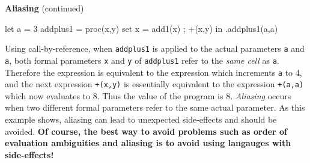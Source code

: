\begin{minipage}[t]{\sw}
\slidenumber
\LARGE
{\bf Aliasing} (continued)
\begin{qv}
let
  a = 3
  addplus1 = proc(x,y) {set x = add1(x) ; +(x,y)}
in
  .addplus1(a,a)
\end{qv}
Using call-by-reference,
when \verb'addplus1' is applied
to the actual parameters \verb'a' and \verb'a',
both formal parameters \verb'x' and \verb'y' of \verb'addplus1'
refer to the {\em same cell} as \verb'a'.
Therefore the  expression
is equivalent to the expression
which increments \verb'a' to 4,
and the next expression \verb'+(x,y)' is essentially equivalent
to the expression \verb'+(a,a)' which now evaluates to 8.
Thus the value of the program is 8.\exx
{\em Aliasing} occurs when two different formal parameters
refer to the same actual parameter.
As this example shows, aliasing can lead
to unexpected side-effects and should be avoided.
{\bf Of course, the best way to avoid problems such as
order of evaluation ambiguities and aliasing
is to avoid using langauges with side-effects!}
\end{minipage}
